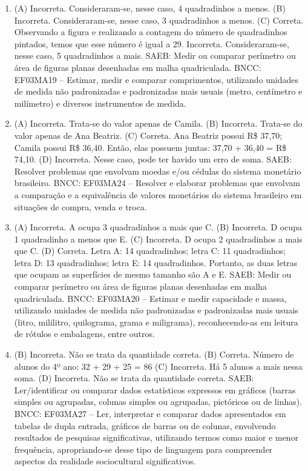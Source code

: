 \begin{enumerate}
\item
(A) Incorreta. Consideraram-se, nesse caso, 4 quadradinhos a menos.
(B) Incorreta. Consideraram-se, nesse caso, 3 quadradinhos a menos.
(C) Correta. Observando a figura e realizando a contagem do número de quadradinhos
pintados, temos que esse número é igual a 29.
Incorreta. Consideraram-se, nesse caso, 5 quadradinhos a mais.
SAEB: Medir ou comparar perímetro ou área de figuras planas
desenhadas em malha quadriculada.
BNCC: EF03MA19 -- Estimar, medir e comparar comprimentos, utilizando unidades de medida
não padronizadas e padronizadas mais usuais (metro, centímetro e milímetro) e diversos
instrumentos de medida.

\item
(A) Incorreta. Trata-se do valor apenas de Camila.
(B) Incorreta. Trata-se do valor apenas de Ana Beatriz.
(C) Correta. Ana Beatriz possui R\$ 37,70; Camila possui R\$ 36,40. Então, elas possuem juntas: 37,70 + 36,40 = R\$ 74,10.
(D) Incorreta. Nesse caso, pode ter havido um erro de soma.
SAEB: Resolver problemas que envolvam moedas e/ou cédulas do
sistema monetário brasileiro.
BNCC: EF03MA24 -- Resolver e elaborar problemas que envolvam a comparação e a equivalência de
valores monetários do sistema brasileiro em situações de compra, venda e troca.

\item
(A) Incorreta. A ocupa 3 quadradinhos a mais que C.
(B) Incorreta. D ocupa 1 quadradinho a menos que E.
(C) Incorreta. D ocupa 2 quadradinhos a mais que C.
(D) Correta. Letra A: 14 quadradinhos; letra C: 11 quadradinhos; letra D: 13 quadradinhos; letra E: 14 quadradinhos. Portanto, as duas letras que ocupam as superfícies de mesmo tamanho são A e E.
SAEB: Medir ou comparar perímetro ou área de figuras planas
desenhadas em malha quadriculada.
BNCC: EF03MA20 -- Estimar e medir capacidade e massa, utilizando unidades de medida não
padronizadas e padronizadas mais usuais (litro, mililitro, quilograma, grama e miligrama),
reconhecendo-as em leitura de rótulos e embalagens, entre outros.

\item
(B) Incorreta. Não se trata da quantidade correta.
(B) Correta. Número de alunos do 4º ano: 32 + 29 + 25 = 86 
(C) Incorreta. Há 5 alunos a mais nessa soma.
(D) Incorreta. Não se trata da quantidade correta.
SAEB: Ler/identificar ou comparar dados estatísticos
expressos em gráficos (barras simples ou agrupadas, colunas simples ou
agrupadas, pictóricos ou de linhas).
BNCC: EF03MA27 -- Ler, interpretar e comparar dados apresentados em tabelas de dupla entrada,
gráficos de barras ou de colunas, envolvendo resultados de pesquisas significativas, utilizando
termos como maior e menor frequência, apropriando-se desse tipo de linguagem para
compreender aspectos da realidade sociocultural significativos.


\end{enumerate}
